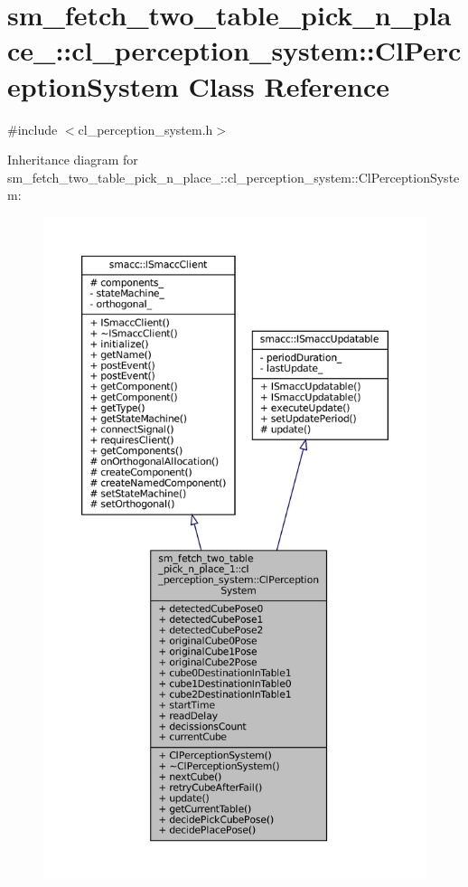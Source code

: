 \hypertarget{classsm__fetch__two__table__pick__n__place__1_1_1cl__perception__system_1_1ClPerceptionSystem}{}\section{sm\+\_\+fetch\+\_\+two\+\_\+table\+\_\+pick\+\_\+n\+\_\+place\+\_\+:\+:cl\+\_\+perception\+\_\+system\+:\+:Cl\+Perception\+System Class Reference}
\label{classsm__fetch__two__table__pick__n__place__1_1_1cl__perception__system_1_1ClPerceptionSystem}


{\ttfamily \#include $<$cl\+\_\+perception\+\_\+system.\+h$>$}



Inheritance diagram for sm\+\_\+fetch\+\_\+two\+\_\+table\+\_\+pick\+\_\+n\+\_\+place\+\_\+:\+:cl\+\_\+perception\+\_\+system\+:\+:Cl\+Perception\+System\+:
\nopagebreak
\begin{figure}[H]
\begin{center}
\leavevmode
\includegraphics[height=550pt]{classsm__fetch__two__table__pick__n__place__1_1_1cl__perception__system_1_1ClPerceptionSystem__inherit__graph}
\end{center}
\end{figure}


